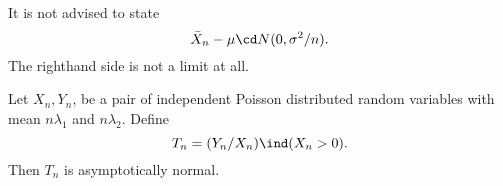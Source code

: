 It is not advised to state
\[
\bar X_n - \mu \cd N(0, \sigma^2/n).
\]
The righthand side is not a limit at all.

\begin{example}
Let $X_n, Y_n$, be a pair of independent Poisson distributed random
variables with mean $n \lambda_1$ and $n \lambda_2$. 
Define
\[
T_n = ({Y_n}/{X_n}) \ind (X_n > 0).
\]
Then $T_n$ is asymptotically normal.
\end{example}

